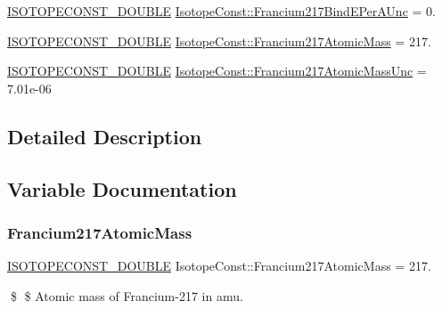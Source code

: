\begin{DoxyCompactItemize}
\mbox{\hyperlink{group___isotope_const-_macros_ga8f45a7272ce02c0b4c65c44636ed719a}{I\+S\+O\+T\+O\+P\+E\+C\+O\+N\+S\+T\+\_\+\+D\+O\+U\+B\+LE}} \mbox{\hyperlink{group___isotope_const-_francium-_fr217_gab0e4a5f6c3b0ccc5785d24ebaeb0792f}{Isotope\+Const\+::\+Francium217\+Bind\+E\+Per\+A\+Unc}} = 0.
\item 
\mbox{\hyperlink{group___isotope_const-_macros_ga8f45a7272ce02c0b4c65c44636ed719a}{I\+S\+O\+T\+O\+P\+E\+C\+O\+N\+S\+T\+\_\+\+D\+O\+U\+B\+LE}} \mbox{\hyperlink{group___isotope_const-_francium-_fr217_ga2250261fd4753d2bc91db7864e68895c}{Isotope\+Const\+::\+Francium217\+Atomic\+Mass}} = 217.
\item 
\mbox{\hyperlink{group___isotope_const-_macros_ga8f45a7272ce02c0b4c65c44636ed719a}{I\+S\+O\+T\+O\+P\+E\+C\+O\+N\+S\+T\+\_\+\+D\+O\+U\+B\+LE}} \mbox{\hyperlink{group___isotope_const-_francium-_fr217_ga714ad511f8e1015c2c458686ddf2e9c8}{Isotope\+Const\+::\+Francium217\+Atomic\+Mass\+Unc}} = 7.\+01e-\/06
\end{DoxyCompactItemize}


\subsection{Detailed Description}


\subsection{Variable Documentation}
\mbox{\label{group___isotope_const-_francium-_fr217_ga2250261fd4753d2bc91db7864e68895c}} 
\subsubsection{\texorpdfstring{Francium217\+Atomic\+Mass}{Francium217AtomicMass}}
{\footnotesize\ttfamily \mbox{\hyperlink{group___isotope_const-_macros_ga8f45a7272ce02c0b4c65c44636ed719a}{I\+S\+O\+T\+O\+P\+E\+C\+O\+N\+S\+T\+\_\+\+D\+O\+U\+B\+LE}} Isotope\+Const\+::\+Francium217\+Atomic\+Mass = 217.}

\$ \$ Atomic mass of Francium-\/217 in amu. \mbox{\label{group___isotope_const-_francium-_fr217_ga714ad511f8e1015c2c458686ddf2e9c8}} 
